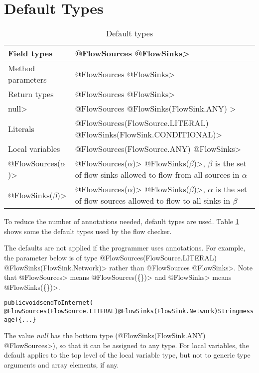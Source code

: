 \section{Default Types\label{flow-defaults}}

\begin{table}[h]
    \begin{tabular}{| l | l |}
     \hline
    Field types &  \<@FlowSources @FlowSinks> \\ \hline
    Method parameters &  \<@FlowSources @FlowSinks> \\ \hline
    Return types &  \<@FlowSources @FlowSinks> \\ \hline
    \<null> &  \<@FlowSources @FlowSinks(FlowSink.ANY) >\\ \hline
    Literals & \<@FlowSources(FlowSource.LITERAL) @FlowSinks(FlowSink.CONDITIONAL)>\\ \hline
   Local variables  &   \<@FlowSources(FlowSource.ANY) @FlowSinks> \\ \hline
   \<@FlowSources($\alpha$)>&\<@FlowSources($\alpha$)>
   \<@FlowSinks($\beta$)>,  $\beta$ is the set of flow sinks allowed to flow from all sources in $\alpha$ \\ \hline
      \<@FlowSinks($\beta$)>&\<@FlowSources($\alpha$)>
      \<@FlowSinks($\beta$)>, $\alpha$ is the set of flow sources allowed to flow to all sinks in $\beta$ \\ \hline
    \end{tabular}
    \caption{Default types}\label{table:defaults}
\end{table}


To reduce the number of annotations needed, default types are used. Table \ref{table:defaults} 
shows some  the default types used by the flow checker. 


 The defaults are not applied if the programmer uses annotations.  For example, the parameter 
below is of type \<@FlowSources(FlowSource.LITERAL) @FlowSinks(FlowSink.Network)> rather
than  \<@FlowSources @FlowSinks>. Note that \<@FlowSources> means \<@FlowSources(\{\})>
 and \<@FlowSinks>  means \<@FlowSinks(\{\})>.
\begin{alltt}
public void sendToInternet(
     @FlowSources(FlowSource.LITERAL)@FlowSinks(FlowSink.Network) String message)\{...\}
\end{alltt} 

The value \emph{null} has the bottom type (\<@FlowSinks(FlowSink.ANY) @FlowSources>), 
so that it can be assigned to any type. For local variables, the default applies to
the top level of the local variable type, but not to generic type arguments
and array elements, if any.

